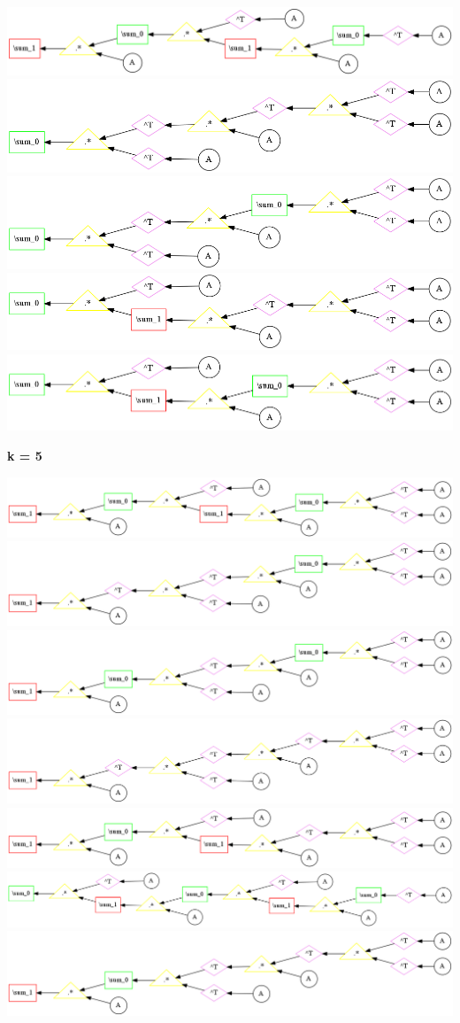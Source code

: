 \begin{center}
\includegraphics[width=0.45\linewidth]{trees/Sym_4_horizontal_0.png}
\includegraphics[width=0.45\linewidth]{trees/Sym_4_horizontal_1.png}
\includegraphics[width=0.45\linewidth]{trees/Sym_4_horizontal_2.png}
\includegraphics[width=0.45\linewidth]{trees/Sym_4_horizontal_3.png}
\includegraphics[width=0.45\linewidth]{trees/Sym_4_horizontal_4.png}
\end{center}


{\bf k = 5}


\begin{center}
\includegraphics[width=0.45\linewidth]{trees/Sym_5_horizontal_0.png}
\includegraphics[width=0.45\linewidth]{trees/Sym_5_horizontal_1.png}
\includegraphics[width=0.45\linewidth]{trees/Sym_5_horizontal_2.png}
\includegraphics[width=0.45\linewidth]{trees/Sym_5_horizontal_3.png}
\includegraphics[width=0.45\linewidth]{trees/Sym_5_horizontal_4.png}
\includegraphics[width=0.45\linewidth]{trees/Sym_5_horizontal_5.png}
\includegraphics[width=0.45\linewidth]{trees/Sym_5_horizontal_6.png}
\end{center}


